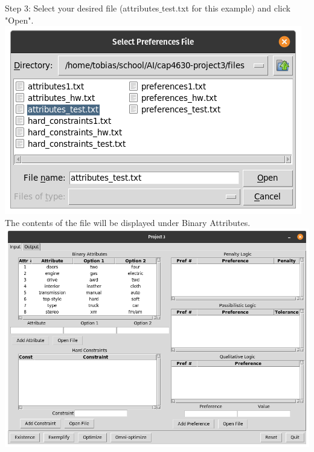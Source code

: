 \documentclass[12pt]{report}
\begin{document}
Step 3: Select your desired file (attributes$\_$test.txt for this example) and click "Open".\\
\includegraphics[scale=0.3]{select_attributes}\\
The contents of the file will be displayed under Binary Attributes.\\
\includegraphics[scale=0.3]{attributes_imported}
\newpage
\end{document}
